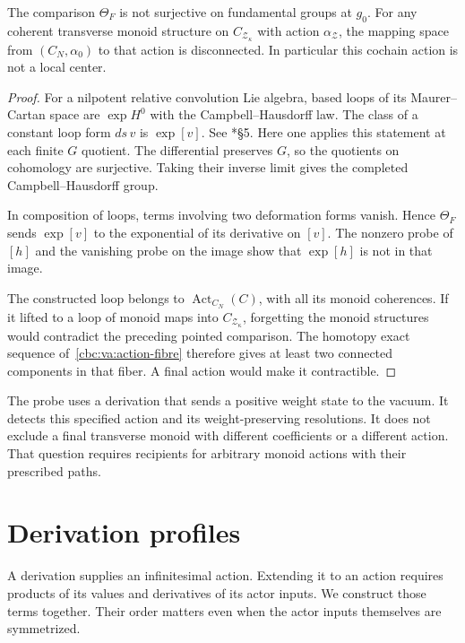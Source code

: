 \begin{theorem}\label{cbc:va:cochain-nonfinal}
The comparison $\Theta_F$ is not surjective on
fundamental groups at $g_0$.
For any coherent transverse monoid structure on
$C_{\mathcal Z_\kappa}$ with action
$\alpha_{\mathcal Z}$, the mapping space from
$(C_N,\alpha_0)$ to that action is disconnected.
In particular this cochain action is not a local center.
\end{theorem}
\begin{proof}
For a nilpotent relative convolution Lie algebra,
based loops of its Maurer--Cartan space are
$\exp H^0$ with the Campbell--Hausdorff law.
The class of a constant loop form $ds\,v$ is
$\exp[v]$. See \cite{Getzler2009}*{\S5}.
Here one applies this statement at each finite
$G$ quotient. The differential preserves $G$,
so the quotients on cohomology are surjective.
Taking their inverse limit gives the completed
Campbell--Hausdorff group.

In composition of loops, terms involving two
deformation forms vanish. Hence $\Theta_F$ sends
$\exp[v]$ to the exponential of its derivative
on $[v]$. The nonzero probe of $[h]$ and the
vanishing probe on the image show that
$\exp[h]$ is not in that image.

The constructed loop belongs to
$\operatorname{Act}_{C_N}(C)$, with all its monoid
coherences. If it lifted to a loop of monoid maps
into $C_{\mathcal Z_\kappa}$, forgetting the
monoid structures would contradict the preceding
pointed comparison. The homotopy exact sequence
of~\eqref{cbc:va:action-fibre} therefore gives at
least two connected components in that fiber.
A final action would make it contractible.
\end{proof}

The probe uses a derivation that sends a positive
weight state to the vacuum. It detects this
specified action and its weight-preserving
resolutions. It does not exclude a final transverse
monoid with different coefficients or a
different action. That question requires recipients
for arbitrary monoid actions with their prescribed paths.

\section{Derivation profiles}
\label{cbc:va:profiles}

A derivation supplies an infinitesimal action. Extending
it to an action requires products of its values and
derivatives of its actor inputs. We construct those
terms together. Their order matters even when the
actor inputs themselves are symmetrized.

